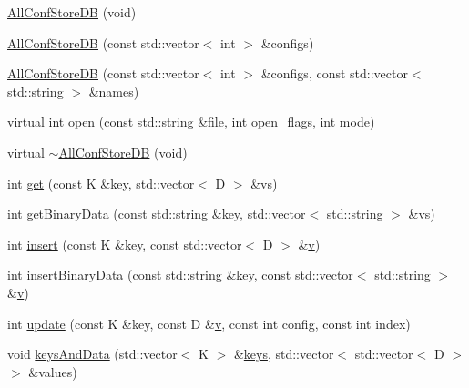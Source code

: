 \begin{DoxyCompactItemize}
\item 
\mbox{\hyperlink{classFILEDB_1_1AllConfStoreDB_a72b72501b29029e2bfb682565f96eac0}{All\+Conf\+Store\+DB}} (void)
\item 
\mbox{\hyperlink{classFILEDB_1_1AllConfStoreDB_a9a8553b0ce3ac82be098130d08f62162}{All\+Conf\+Store\+DB}} (const std\+::vector$<$ int $>$ \&configs)
\item 
\mbox{\hyperlink{classFILEDB_1_1AllConfStoreDB_ab8b213578395f0ac7d436a82f4a26fe1}{All\+Conf\+Store\+DB}} (const std\+::vector$<$ int $>$ \&configs, const std\+::vector$<$ std\+::string $>$ \&names)
\item 
virtual int \mbox{\hyperlink{classFILEDB_1_1AllConfStoreDB_aa6e6deb3c33076d16db4ac0560f0d75f}{open}} (const std\+::string \&file, int open\+\_\+flags, int mode)
\item 
virtual \mbox{\hyperlink{classFILEDB_1_1AllConfStoreDB_ac5fe65eab60f20d7b8124c69c0bd5923}{$\sim$\+All\+Conf\+Store\+DB}} (void)
\item 
int \mbox{\hyperlink{classFILEDB_1_1AllConfStoreDB_a848466f7dce25cacc4e8560c50240d35}{get}} (const K \&key, std\+::vector$<$ D $>$ \&vs)
\item 
int \mbox{\hyperlink{classFILEDB_1_1AllConfStoreDB_aa923faf368f0aa7d327c2a3702d261c1}{get\+Binary\+Data}} (const std\+::string \&key, std\+::vector$<$ std\+::string $>$ \&vs)
\item 
int \mbox{\hyperlink{classFILEDB_1_1AllConfStoreDB_abf4a1ccd7306de436ba1ec61b242e02f}{insert}} (const K \&key, const std\+::vector$<$ D $>$ \&\mbox{\hyperlink{hadron__timeslice_8cc_a716fc87f5e814be3ceee2405ed6ff22a}{v}})
\item 
int \mbox{\hyperlink{classFILEDB_1_1AllConfStoreDB_ac2c898624d4b32c526951edfb6271d60}{insert\+Binary\+Data}} (const std\+::string \&key, const std\+::vector$<$ std\+::string $>$ \&\mbox{\hyperlink{hadron__timeslice_8cc_a716fc87f5e814be3ceee2405ed6ff22a}{v}})
\item 
int \mbox{\hyperlink{classFILEDB_1_1AllConfStoreDB_a3beaa117f0ddf32de13d5f96643b626c}{update}} (const K \&key, const D \&\mbox{\hyperlink{hadron__timeslice_8cc_a716fc87f5e814be3ceee2405ed6ff22a}{v}}, const int config, const int index)
\item 
void \mbox{\hyperlink{classFILEDB_1_1AllConfStoreDB_a9150983c712d6b870a75886f92b10a9d}{keys\+And\+Data}} (std\+::vector$<$ K $>$ \&\mbox{\hyperlink{classFILEDB_1_1ConfDataStoreDB_a794e05e3888ab95e0396a196b5a18e65}{keys}}, std\+::vector$<$ std\+::vector$<$ D $>$ $>$ \&values)

\end{DoxyCompactItemize}

